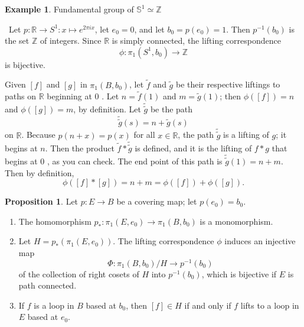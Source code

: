 \documentclass[12pt,a4paper]{book}
\newenvironment{prooff}{{\noindent\it\textcolor{cyan!40!black}{Proof}:}\,}{\par}
\newcommand{\bb}[1]{\mathbb{#1}}
\newenvironment{enu}{\begin{enumerate}[(1)]}{\end{enumerate}}
\theoremstyle{definition}
\newtheorem{prop}[defn]{Proposition}
\newtheorem{exam}[defn]{Example}
\begin{document}
\begin{exam}
    Fundamental group of $\bb{S}^1\simeq \bb{Z}$
    \label{example:fundamental group of S1}
\end{exam}
\begin{prooff}
    Let $p: \mathbb{R} \rightarrow S^1:x\mapsto e^{2\pi ix}$, let $e_0=0$, and let $b_0=p\left(e_0\right)=1$. Then $p^{-1}\left(b_0\right)$ is the set $\mathbb{Z}$ of integers. Since $\mathbb{R}$ is simply connected, the lifting correspondence
    $$
        \phi: \pi_1\left(S^1, b_0\right) \rightarrow \mathbb{Z}
    $$
    is bijective.

    Given $[f]$ and $[g]$ in $\pi_1\left(B, b_0\right)$, let $\tilde{f}$ and $\tilde{g}$ be their respective liftings to paths on $\mathbb{R}$ beginning at 0 . Let $n=\tilde{f}(1)$ and $m=\tilde{g}(1)$; then $\phi([f])=n$ and $\phi([g])=m$, by definition. Let $\tilde{\tilde{g}}$ be the path
    $$
        \tilde{\tilde{g}}(s)=n+\tilde{g}(s)
    $$
    on $\mathbb{R}$. Because $p(n+x)=p(x)$ for all $x \in \mathbb{R}$, the path $\tilde{\tilde{g}}$ is a lifting of $g$; it begins at $n$. Then the product $\tilde{f} * \tilde{\tilde{g}}$ is defined, and it is the lifting of $f * g$ that begins at 0 , as you can check. The end point of this path is $\tilde{\tilde{g}}(1)=n+m$. Then by definition,
    $$
        \phi([f] *[g])=n+m=\phi([f])+\phi([g]) .
    $$
\end{prooff}
\begin{prop}
    Let $p: E \rightarrow B$ be a covering map; let $p\left(e_0\right)=b_0$.
    \begin{enu}
        \item  The homomorphism $p_*: \pi_1\left(E, e_0\right) \rightarrow \pi_1\left(B, b_0\right)$ is a monomorphism.
        \item  Let $H=p_*\left(\pi_1\left(E, e_0\right)\right)$. The lifting correspondence $\phi$ induces an injective map
        $$
            \Phi: \pi_1\left(B, b_0\right) / H \rightarrow p^{-1}\left(b_0\right)
        $$
        of the collection of right cosets of $H$ into $p^{-1}\left(b_0\right)$, which is bijective if $E$ is path connected.
        \item  If $f$ is a loop in $B$ based at $b_0$, then $[f] \in H$ if and only if $f$ lifts to a loop in $E$ based at $e_0$.
    \end{enu}
\end{prop}
\end{document}
